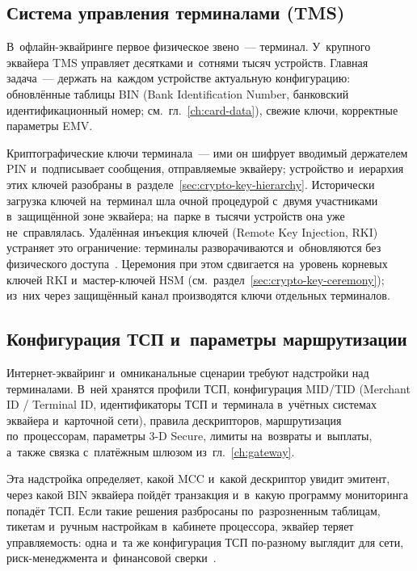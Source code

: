 \subsection*{Система управления терминалами (TMS)}

В~офлайн-эквайринге первое физическое звено~--- терминал. У~крупного эквайера
TMS управляет десятками и~сотнями тысяч устройств. Главная задача~--- держать
на~каждом устройстве актуальную конфигурацию: обновлённые таблицы BIN (Bank
  Identification Number, банковский идентификационный номер;
см.~гл.~\ref{ch:card-data}), свежие ключи, корректные параметры EMV.

Криптографические ключи терминала~--- ими он шифрует вводимый держателем PIN
и~подписывает сообщения, отправляемые эквайеру; устройство и~иерархия этих
ключей разобраны в~разделе~\ref{sec:crypto-key-hierarchy}. Исторически загрузка
ключей на~терминал шла очной процедурой с~двумя участниками в~защищённой зоне
эквайера; на~парке в~тысячи устройств она уже не~справлялась. Удалённая
инъекция ключей (Remote Key Injection, RKI) устраняет это ограничение: терминалы
разворачиваются и~обновляются без физического
доступа~\cite{visa-tpa-registration-program-faqs}. Церемония при этом
сдвигается на~уровень корневых ключей RKI и~мастер-ключей HSM
(см.~раздел~\ref{sec:crypto-key-ceremony}); из~них через защищённый канал
производятся ключи отдельных терминалов.

\subsection*{Конфигурация ТСП и~параметры маршрутизации}

Интернет-эквайринг и~омниканальные сценарии требуют надстройки над
терминалами. В~ней хранятся профили ТСП, конфигурация MID/TID (Merchant ID
  / Terminal ID, идентификаторы ТСП и~терминала в~учётных системах эквайера
и~карточной сети), правила дескрипторов, маршрутизация по~процессорам,
параметры 3-D Secure, лимиты на~возвраты и~выплаты, а~также связка с~платёжным
шлюзом из~гл.~\ref{ch:gateway}.

Эта надстройка определяет, какой MCC и~какой дескриптор увидит эмитент, через
какой BIN эквайера пойдёт транзакция и~в~какую программу мониторинга попадёт
ТСП. Если такие решения разбросаны по~разрозненным таблицам, тикетам и~ручным
настройкам в~кабинете процессора, эквайер теряет управляемость: одна и~та же
конфигурация ТСП по-разному выглядит для сети, риск-менеджмента
и~финансовой сверки~\cite{visa-merchant-data-standards-manual}.

